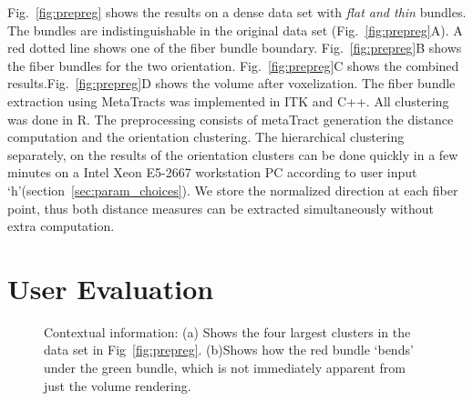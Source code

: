 Fig.~\ref{fig:prepreg} shows the results on a dense data set with \textit{flat and thin} bundles. The bundles are indistinguishable in the original data set (Fig.~\ref{fig:prepreg}A). A red dotted line shows one of the fiber bundle boundary. Fig.~\ref{fig:prepreg}B shows the fiber bundles for the two orientation. Fig.~\ref{fig:prepreg}C shows the combined results.Fig.~\ref{fig:prepreg}D shows the volume after voxelization.
The fiber bundle extraction using MetaTracts was implemented in ITK and C++. All clustering was done in R. The preprocessing consists of metaTract generation the distance computation and the orientation clustering. The hierarchical clustering separately, on the results of the orientation clusters can be done  quickly in a few minutes on a Intel Xeon E5-2667 workstation PC according to user input `h'(section~\ref{sec:param_choices}). We store the normalized direction at each fiber point, thus both distance measures can be extracted simultaneously without extra computation.

\section {User Evaluation}
\label {sec:evaluation}
\begin{figure}[h]
\centering
{}
\caption{Contextual information: (a) Shows the four largest clusters in the data set in Fig~\ref{fig:prepreg}.
(b)Shows how the red bundle `bends' under the green bundle, which is not immediately apparent from just the volume rendering.}
\label{fig:context}
\end{figure}

